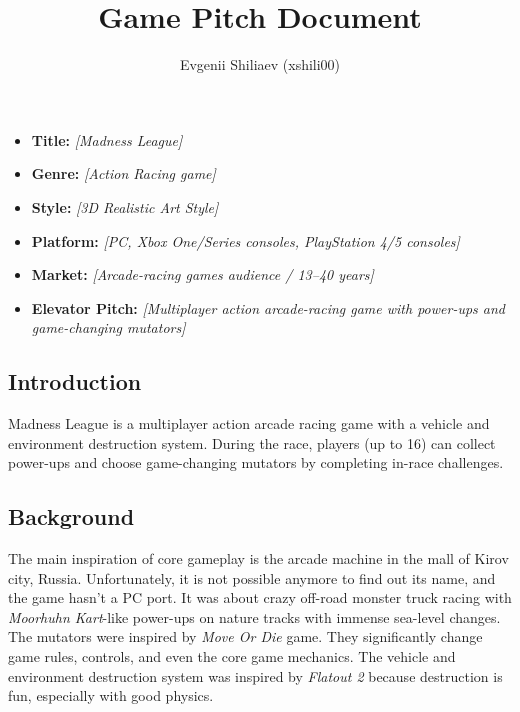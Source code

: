 \documentclass[a4paper,10pt,english]{article}
\title{%
Game Pitch Document%
}
\author{%
Evgenii Shiliaev (xshili00)%
}
\date{}
\newcommand{\ph}[1]{\textit{[#1]}}
\begin{document}
\maketitle
\thispagestyle{empty}

{%
	\large

	\begin{itemize}

		\item[] \textbf{Title:} \ph{Madness League}

		\item[] \textbf{Genre:} \ph{Action Racing game}

		\item[] \textbf{Style:} \ph{3D Realistic Art Style}

		\item[] \textbf{Platform:} \ph{PC, Xbox One/Series consoles, PlayStation 4/5 consoles}

		\item[] \textbf{Market:} \ph{Arcade-racing games audience / 13--40 years}

		\item[] \textbf{Elevator Pitch:} \ph{Multiplayer action arcade-racing game with power-ups and game-changing mutators}

	\end{itemize}

}

\subsection*{Introduction}
Madness League is a multiplayer action arcade racing game with a vehicle and environment destruction system.
During the race, players (up to 16) can collect power-ups and choose game-changing mutators by completing in-race challenges.

\subsection*{Background}
The main inspiration of core gameplay is the arcade machine in the mall of Kirov city, Russia.
Unfortunately, it is not possible anymore to find out its name, and the game hasn't a PC port.
It was about crazy off-road monster truck racing with \emph{Moorhuhn Kart}-like power-ups on nature tracks with immense sea-level changes.
The mutators were inspired by \emph{Move Or Die} game.
They significantly change game rules, controls, and even the core game mechanics.
The vehicle and environment destruction system was inspired by \emph{Flatout 2} because destruction is fun, especially with good physics.
\end{document}
